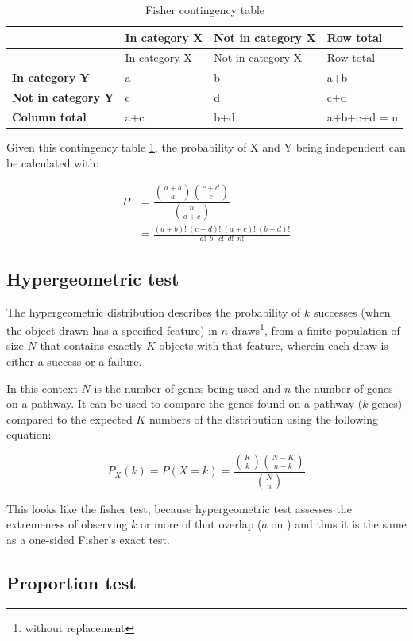 \documentclass[
  a4paper,
]{book}
\begin{document}
\begin{longtable}[]{@{}llll@{}}
\caption{\label{tab:fisher} Fisher contingency table}\tabularnewline
\toprule
& In category X & Not in category X & Row total \\
\midrule
\endfirsthead
\toprule
& In category X & Not in category X & Row total \\
\midrule
\endhead
\textbf{In category Y} & a & b & a+b \\
\textbf{Not in category Y} & c & d & c+d \\
\textbf{Column total} & a+c & b+d & a+b+c+d = n \\
\bottomrule
\end{longtable}

Given this contingency table \ref{tab:fisher}, the probability of X and Y being independent can be calculated with:

\[
\begin{aligned}
P & = \dfrac{ \binom{a+b}{a} \binom{c+d}{c} }{\binom{n}{a+c}} \\
& = \frac{(a+b)!~(c+d)!~(a+c)!~(b+d)!}{a!~~b!~~c!~~d!~~n!}
\end{aligned}
\]

\hypertarget{hypergeometric-test}{%
\subsection{Hypergeometric test}\label{hypergeometric-test}}

The hypergeometric distribution describes the probability of \(k\) successes (when the object drawn has a specified feature) in \(n\) draws\footnote{without replacement}, from a finite population of size \(N\) that contains exactly \(K\) objects with that feature, wherein each draw is either a success or a failure.

In this context \(N\) is the number of genes being used and \(n\) the number of genes on a pathway.
It can be used to compare the genes found on a pathway (\(k\) genes) compared to the expected \(K\) numbers of the distribution using the following equation:

\[
P_X(k) = P(X = k) 
= \frac{\binom{K}{k} \binom{N - K}{n-k}}{\binom{N}{n}}
\]

This looks like the fisher test, because hypergeometric test assesses the extremeness of observing \(k\) or more of
that overlap (\(a\) on ) and thus it is the same as a one-sided Fisher's exact test.

\hypertarget{proportion-test}{%
\subsection{Proportion test}\label{proportion-test}}
\end{document}
